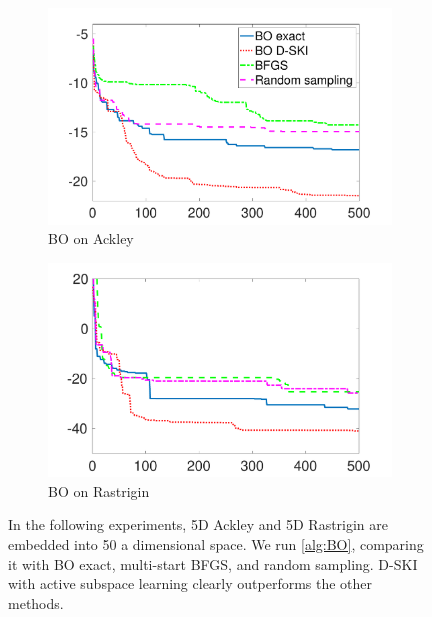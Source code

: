 \begin{figure}[ht]
  \begin{center}
    \begin{subfigure}{0.47\textwidth}
      \centering
      \captionsetup{justification=centering}
      \includegraphics[width=\textwidth,trim=1.5cm 0cm 1.5cm 1cm,clip]
      {./sgp/pics/ackley_50_5}
      \caption{BO on Ackley}\label{fig:bo_ack}
    \end{subfigure}
    \begin{subfigure}{0.47\textwidth}
      \centering
      \captionsetup{justification=centering}
      \includegraphics[width=\textwidth,trim=1.5cm 0cm 1.5cm .5cm,clip]
      {./sgp/pics/rastrigin_50_5}
      \caption{BO on Rastrigin}\label{fig:bo_ras}
    \end{subfigure}
    \caption{In the following experiments, 5D Ackley and 5D Rastrigin are
    embedded into 50 a dimensional space. We run \cref{alg:BO}, comparing it with
    BO exact, multi\hyp{}start BFGS, and random sampling. D\hyp{}SKI with active
    subspace learning clearly outperforms the other methods.}\label{fig:bo}
  \end{center}
\end{figure}


